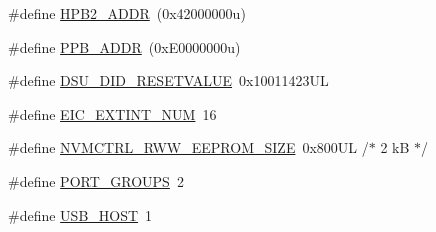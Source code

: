 \begin{DoxyCompactItemize}
\item 
\#define \mbox{\hyperlink{group___s_a_m_d21_g16_b__definitions_gaef42fa53ddf169a2a50be70d29f73571}{H\+P\+B2\+\_\+\+A\+D\+DR}}~(0x42000000u)
\item 
\#define \mbox{\hyperlink{group___s_a_m_d21_g16_b__definitions_ga8895d0a3a9a3126cc44330f86c8ce564}{P\+P\+B\+\_\+\+A\+D\+DR}}~(0x\+E0000000u)
\item 
\#define \mbox{\hyperlink{group___s_a_m_d21_g16_b__definitions_gada75131d542c9e1966238f5488f89bd6}{D\+S\+U\+\_\+\+D\+I\+D\+\_\+\+R\+E\+S\+E\+T\+V\+A\+L\+UE}}~0x10011423\+UL
\item 
\#define \mbox{\hyperlink{group___s_a_m_d21_g16_b__definitions_ga88ebc38c95506296f5d21f82476296ae}{E\+I\+C\+\_\+\+E\+X\+T\+I\+N\+T\+\_\+\+N\+UM}}~16
\item 
\#define \mbox{\hyperlink{group___s_a_m_d21_g16_b__definitions_gacb7a115808eeb0b50bd55888f9ba65ae}{N\+V\+M\+C\+T\+R\+L\+\_\+\+R\+W\+W\+\_\+\+E\+E\+P\+R\+O\+M\+\_\+\+S\+I\+ZE}}~0x800\+U\+L /$\ast$ 2 k\+B $\ast$/
\item 
\#define \mbox{\hyperlink{group___s_a_m_d21_g16_b__definitions_gab9243ffe03a1dc631b57a495b4b3d467}{P\+O\+R\+T\+\_\+\+G\+R\+O\+U\+PS}}~2
\item 
\#define \mbox{\hyperlink{group___s_a_m_d21_g16_b__definitions_ga856aa08fb33114928cbc8635be1792e4}{U\+S\+B\+\_\+\+H\+O\+ST}}~1
\end{DoxyCompactItemize}
